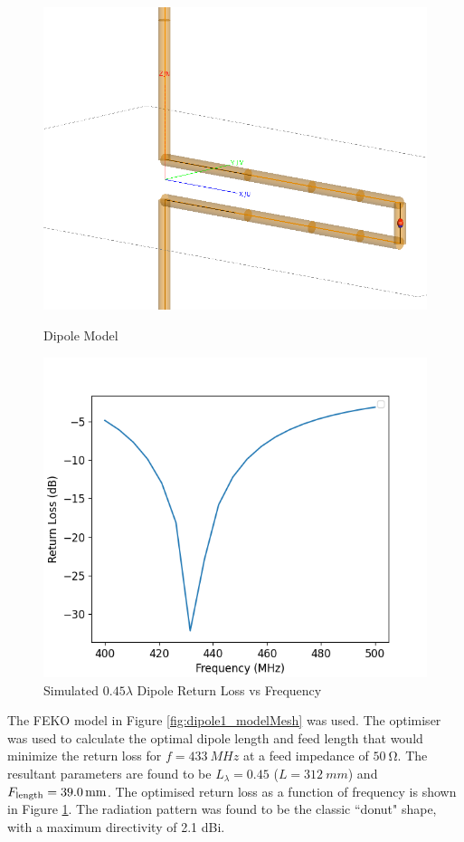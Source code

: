 \begin{figure}[!htb]
  \begin{minipage}{.38\textwidth}
    \centering
    \includegraphics[width=0.95\linewidth]{dipole1_modelMesh}
    \caption{Dipole Model}
    \label{fig:dipole1_modelMesh}
  \end{minipage}
  \begin{minipage}{.6\textwidth}
    \centering
    \includegraphics[width=0.9\linewidth]{dipole1_returnLoss}
    \caption{Simulated $0.45 \lambda$ Dipole Return Loss vs Frequency}
    \label{fig:dipole1_returnLoss}
  \end{minipage}
\end{figure}

The FEKO model in Figure \ref{fig:dipole1_modelMesh} was used. The optimiser was used to calculate the optimal dipole length and feed length that would minimize the return loss for $f = \SI{433}{MHz}$ at a feed impedance of $\SI{50}{\ohm}$. The resultant parameters are found to be $L_\lambda = 0.45$ ($L = \SI{312}{mm}$) and $F_{\textnormal{length}} = \SI{39.0}{mm}$. The optimised return loss as a function of frequency is shown in Figure \ref{fig:dipole1_returnLoss}. The radiation pattern was found to be the classic ``donut" shape, with a maximum directivity of 2.1 dBi.